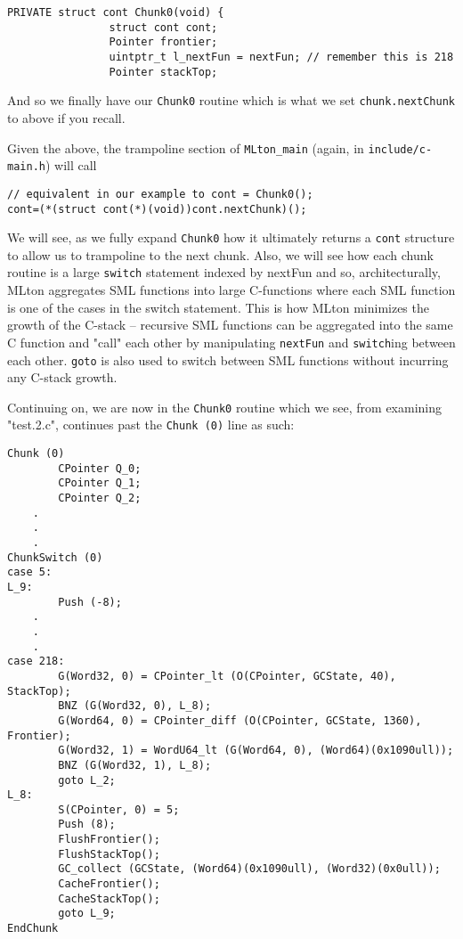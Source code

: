 \begin{minipage}{\linewidth}
\lstset{language=C}\begin{lstlisting}
PRIVATE struct cont Chunk0(void) {
                struct cont cont;
                Pointer frontier;
                uintptr_t l_nextFun = nextFun; // remember this is 218
                Pointer stackTop;
\end{lstlisting}
\renewcommand{\lstlistingname}{Code}
\end{minipage}

And so we finally have our \texttt{Chunk0} routine which is what we set \texttt{chunk.nextChunk} to above if you recall.





Given the above, the trampoline section of \texttt{MLton\_main} (again, in \texttt{include/c-main.h}) will call


\begin{minipage}{\linewidth}
\lstset{language=C}\begin{lstlisting}
// equivalent in our example to cont = Chunk0();
cont=(*(struct cont(*)(void))cont.nextChunk)(); 
\end{lstlisting}
\end{minipage}

We will see, as we fully expand \texttt{Chunk0} how it ultimately returns a \texttt{cont} structure to allow us to trampoline to the next chunk. Also, we will see how each chunk routine is a large \texttt{switch} statement indexed by nextFun and so, architecturally, MLton aggregates SML functions into large C-functions where each SML function is one of the cases in the switch statement. This is how MLton minimizes the growth of the C-stack -- recursive SML functions can be aggregated into the same C function and "call" each other by manipulating \texttt{nextFun} and \texttt{switch}ing between each other. \texttt{goto} is also used to switch between SML functions without incurring any C-stack growth.

Continuing on, we are now in the \texttt{Chunk0} routine which we see, from examining "test.2.c", continues past the \texttt{Chunk (0)} line as such:

\begin{minipage}{\linewidth}
\lstset{language=C}\begin{lstlisting}
Chunk (0)
        CPointer Q_0;
        CPointer Q_1;
        CPointer Q_2;
	.
	.
	.
ChunkSwitch (0)
case 5:
L_9:
        Push (-8);
	.
	.
	.
case 218:
        G(Word32, 0) = CPointer_lt (O(CPointer, GCState, 40), StackTop);
        BNZ (G(Word32, 0), L_8);
        G(Word64, 0) = CPointer_diff (O(CPointer, GCState, 1360), Frontier);
        G(Word32, 1) = WordU64_lt (G(Word64, 0), (Word64)(0x1090ull));
        BNZ (G(Word32, 1), L_8);
        goto L_2;
L_8:
        S(CPointer, 0) = 5;
        Push (8);
        FlushFrontier();
        FlushStackTop();
        GC_collect (GCState, (Word64)(0x1090ull), (Word32)(0x0ull));
        CacheFrontier();
        CacheStackTop();
        goto L_9;
EndChunk
\end{lstlisting}
\end{minipage}

